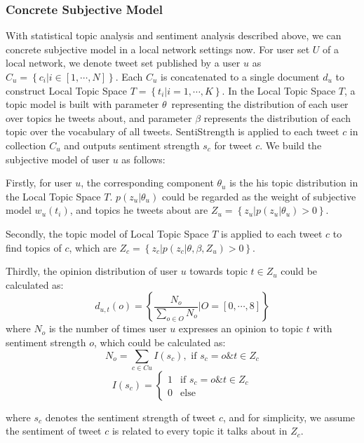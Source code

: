 \documentclass{acm_proc_article-sp}
\begin{document}
\subsubsection{Concrete Subjective Model}
\label{concrete}
With statistical topic analysis and sentiment analysis described above, we can concrete subjective model in a local network settings now. 
For user set $ U $ of a local network, we denote tweet set published by a user $ u $ as $ C_{u}=\left\lbrace c_{i} \vert i \in \left[ 1, \cdots, N \right]  \right\rbrace$. Each $ C_{u} $ is concatenated to a single document $ d_{u} $ to construct Local Topic Space $ T=\left\lbrace t_{i} \vert i=1, \cdots, K \right\rbrace $.
In the Local Topic Space $ T $, a topic model is built with parameter $ \theta $\ representing the distribution of each user over topics he tweets about, and
parameter $ \beta $ represents the distribution of each topic over the vocabulary of all tweets. SentiStrength is applied to each tweet $ c $ in collection $ C_{u} $ and outputs sentiment strength $ s_{c} $ for tweet $ c $. 
We build the subjective model of user $ u $ as follows:
\begin{itemize*}
\item Firstly, for user $ u $, the corresponding component $ \theta_{u} $ is the his topic distribution in the Local Topic Space $ T $. $ p\left( z_{u} \vert \theta_{u} \right)  $ could be regarded as the weight of subjective model $ w_{u} \left( t_{i} \right)  $, and topics he tweets about are $ Z_{u}= \left\lbrace z_{u} \vert p\left( z_{u} \vert \theta_{u} \right)>0 \right\rbrace $.
\item Secondly, the topic model of Local Topic Space $ T $ is applied to each tweet $ c $ to find topics of $ c $, which are $ Z_{c} =\left\lbrace z_{c} \vert p\left( z_{c} \vert \theta, \beta, Z_{u} \right)>0 \right\rbrace $.
\item Thirdly, the opinion distribution of user $ u $ towards topic $ t \in Z_{u} $ could be calculated as:
\begin{equation}
\label{opinionall}
d_{u,t}\left( o \right) = \left\lbrace \dfrac{N_{o}}{\sum_{o \in O} N_{o}} \vert O=\left[ 0, \cdots, 8 \right] \right\rbrace 
\end{equation}
where $ N_{o} $ is the number of times user $ u $ expresses an opinion to topic $ t $ with sentiment strength $ o $, which could be calculated as:
\begin{equation}
\label{opinion1}
N_{o}=\sum_{c \in Cu} I\left( s_{c} \right) , \text{ if } s_{c}=o \& t \in Z_{c}
\end{equation}
\begin{equation}
\label{opinion2}
I\left( s_{c} \right)=\left\{
\begin{array}{ll}
{1} & \text{if } s_{c}=o \& t \in Z_{c}\\
{0} & \text{else}
\end{array}
\right.
\end{equation}

where $ s_{c} $ denotes the sentiment strength of tweet $ c $, and for simplicity, we assume the sentiment of tweet $ c $ is related to every topic it talks about in $ Z_{c} $.

\end{itemize*}
\end{document}
